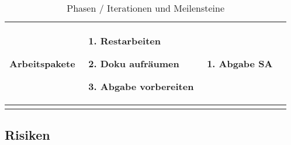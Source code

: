 \begin{landscape}
\begin{longtable}{l p{5.5cm} p{5.5cm} p{5.5cm}}
        \textbf{Arbeitspakete}
                                & \begin{enumerate}[noitemsep]
                                    \item Restarbeiten
                                    \item Doku aufräumen
                                    \item Abgabe vorbereiten
                                \end{enumerate}
                                & \begin{enumerate}[noitemsep]
                                    \item Abgabe SA
                                \end{enumerate}
                                & \\
        
        \bottomrule
    \caption{Phasen / Iterationen und Meilensteine}
    \label{table:Phasen / Iterationen und Meilensteine}
\end{longtable}
\end{landscape}

\subsection{Risiken}
\label{sub:Risiken}


